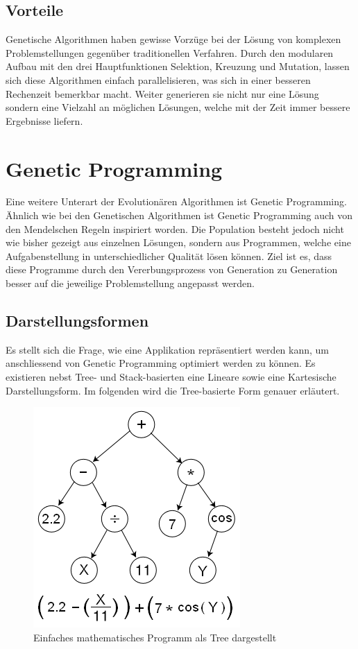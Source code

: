 \subsection{Vorteile}
Genetische Algorithmen haben gewisse Vorzüge bei der Lösung von komplexen
Problemstellungen gegenüber traditionellen Verfahren. Durch den modularen Aufbau
mit den drei Hauptfunktionen Selektion, Kreuzung und Mutation, lassen sich diese
Algorithmen einfach parallelisieren, was sich in einer besseren Rechenzeit bemerkbar
macht. Weiter generieren sie nicht nur eine Lösung sondern eine Vielzahl an möglichen
Lösungen, welche mit der Zeit immer bessere Ergebnisse liefern. \cite{Gou19}

\section{Genetic Programming}
Eine weitere Unterart der Evolutionären Algorithmen ist Genetic Programming. Ähnlich wie
bei den Genetischen Algorithmen ist Genetic Programming auch von den Mendelschen Regeln
inspiriert worden. Die Population besteht jedoch nicht wie bisher gezeigt aus einzelnen
Lösungen, sondern aus Programmen, welche eine Aufgabenstellung in unterschiedlicher
Qualität lösen können. Ziel ist es, dass diese Programme durch den Vererbungsprozess
von Generation zu Generation besser auf die jeweilige Problemstellung angepasst werden.
\cite{GenGP}

\subsection{Darstellungsformen}
Es stellt sich die Frage, wie eine Applikation repräsentiert werden kann, um anschliessend von
Genetic Programming optimiert werden zu können. Es existieren nebst Tree- und Stack-basierten
eine Lineare sowie eine Kartesische Darstellungsform. Im folgenden wird die Tree-basierte Form
genauer erläutert.

\begin{figure}[h!]
  \centering
  \includegraphics[scale=0.5]{resources/genetic_program_tree.png}
  \caption{Einfaches mathematisches Programm als Tree dargestellt}
  \label{fig:gp_tree}
\end{figure}

